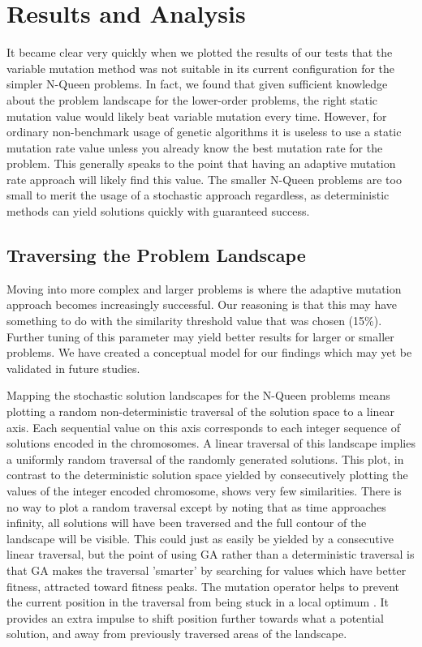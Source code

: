 \documentclass[conference]{IEEEtran}
\begin{document}
\section{Results and Analysis}
It became clear very quickly when we plotted the results of our tests that the variable mutation method was not suitable in its current configuration for the simpler N-Queen problems. In fact, we found that given sufficient knowledge about the problem landscape for the lower-order problems, the right static mutation value would likely beat variable mutation every time. However, for ordinary non-benchmark usage of genetic algorithms it is useless to use a static mutation rate value unless you already know the best mutation rate for the problem. This generally speaks to the point that having an adaptive mutation rate approach will likely find this value. The smaller N-Queen problems are too small to merit the usage of a stochastic approach regardless, as deterministic methods can yield solutions quickly with guaranteed success.

\subsection{Traversing the Problem Landscape}
Moving into more complex and larger problems is where the adaptive mutation approach becomes increasingly successful. Our reasoning is that this may have something to do with the similarity threshold value that was chosen (15\%). Further tuning of this parameter may yield better results for larger or smaller problems. We have created a conceptual model for our findings which may yet be validated in future studies.

Mapping the stochastic solution landscapes for the N-Queen problems means plotting a random non-deterministic traversal of the solution space to a linear axis. Each sequential value on this axis corresponds to each integer sequence of solutions encoded in the chromosomes. A linear traversal of this landscape implies a uniformly random traversal of the randomly generated solutions. This plot, in contrast to the deterministic solution space yielded by consecutively plotting the values of the integer encoded chromosome, shows very few similarities. There is no way to plot a random traversal except by noting that as time approaches infinity, all solutions will have been traversed and the full contour of the landscape will be visible. This could just as easily be yielded by a consecutive linear traversal, but the point of using GA rather than a deterministic traversal is that GA makes the traversal 'smarter' by searching for values which have better fitness, attracted toward fitness peaks\cite{srinivas1994genetic}. The mutation operator helps to prevent the current position in the traversal from being stuck in a local optimum \cite{ye2010some}. It provides an extra impulse to shift position further towards what a potential solution, and away from previously traversed areas of the landscape.
\end{document}
